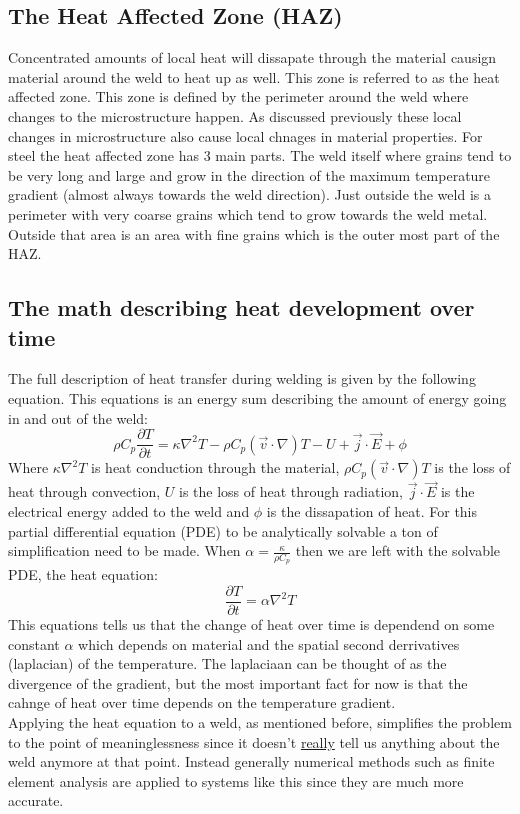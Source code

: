 \documentclass[11pt, a4paper]{article}
\begin{document}
\subsection{The Heat Affected Zone (HAZ)}
Concentrated amounts of local heat will dissapate through the material causign material around the weld to heat up as well. This zone is referred to as the heat affected zone. This zone is defined by the perimeter around the weld where changes to the microstructure happen. As discussed previously these local changes in microstructure also cause local chnages in material properties. For steel the heat affected zone has 3 main parts. The weld itself where grains tend to be very long and large and grow in the direction of the maximum temperature gradient (almost always towards the weld direction). Just outside the weld is a perimeter with very coarse grains which tend to grow towards the weld metal. Outside that area is an area with fine grains which is the outer most part of the HAZ.


\subsection{The math describing heat development over time}
The full description of heat transfer during welding is given by the following equation. This equations is an energy sum describing the amount of energy going in and out of the weld:
\begin{equation}
  \rho C_p \frac{\partial T}{\partial t} = \kappa \nabla^2 T - \rho C_p (\vec{v}\cdot \nabla)T - U + \vec{j} \cdot \vec{E} + \phi
\end{equation}
Where $\kappa \nabla^2 T$ is heat conduction through the material, $\rho C_p (\vec{v} \cdot \nabla)T$ is the loss of heat through convection, $U$ is the loss of heat through radiation, $\vec{j}\cdot \vec{E}$ is the electrical energy added to the weld and $\phi$ is the dissapation of heat. For this partial differential equation (PDE) to be analytically solvable a ton of simplification need to be made. When $\alpha = \frac{\kappa}{\rho C_p}$ then we are left with the solvable PDE, the heat equation:
\begin{equation}
  \frac{\partial T}{\partial t} = \alpha \nabla^2 T
\end{equation}
This equations tells us that the change of heat over time is dependend on some constant $\alpha$ which depends on material and the spatial second derrivatives (laplacian) of the temperature. The laplaciaan can be thought of as the divergence of the gradient, but the most important fact for now is that the cahnge of heat over time depends on the temperature gradient.\\
Applying the heat equation to a weld, as mentioned before, simplifies the problem to the point of meaninglessness since it doesn't \underline{really} tell us anything about the weld anymore at that point. Instead generally numerical methods such as finite element analysis are applied to systems like this since they are much more accurate.
\end{document}
